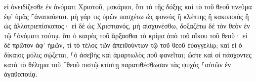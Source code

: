 \documentclass{openreader}
\begin{document}
εἰ ὀνειδίζεσθε ἐν ὀνόματι Χριστοῦ, μακάριοι, ὅτι τὸ τῆς δόξης καὶ τὸ τοῦ θεοῦ πνεῦμα ἐφ’ ὑμᾶς ⸀ἀναπαύεται. 
μὴ γάρ τις ὑμῶν πασχέτω ὡς φονεὺς ἢ κλέπτης ἢ κακοποιὸς ἢ ὡς ἀλλοτριεπίσκοπος· 
εἰ δὲ ὡς Χριστιανός, μὴ αἰσχυνέσθω, δοξαζέτω δὲ τὸν θεὸν ἐν τῷ ⸀ὀνόματι τούτῳ. 
ὅτι ὁ καιρὸς τοῦ ἄρξασθαι τὸ κρίμα ἀπὸ τοῦ οἴκου τοῦ θεοῦ· εἰ δὲ πρῶτον ἀφ’ ἡμῶν, τί τὸ τέλος τῶν ἀπειθούντων τῷ τοῦ θεοῦ εὐαγγελίῳ; 
καὶ εἰ ὁ δίκαιος μόλις σῴζεται, ⸀ὁ ἀσεβὴς καὶ ἁμαρτωλὸς ποῦ φανεῖται; 
ὥστε καὶ οἱ πάσχοντες κατὰ τὸ θέλημα τοῦ ⸀θεοῦ πιστῷ κτίστῃ παρατιθέσθωσαν τὰς ψυχὰς ⸀αὐτῶν ἐν ἀγαθοποιΐᾳ. 
\end{document}
